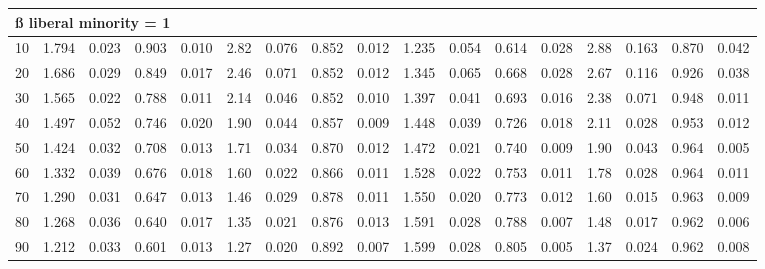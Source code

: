 \documentclass[
]{article}
\begin{document}
\begin{table}[H]
\begin{table}
{\begin{tabular}{r|r|r|r|r|r|r|r|r|r|r|r|r|r|r|r|r}
\hline
\multicolumn{17}{l}{\textbf{ß liberal minority = 1}}\\
\hline
\hspace{1em}10 & 1.794 & 0.023 & 0.903 & 0.010 & 2.82 & 0.076 & 0.852 & 0.012 & 1.235 & 0.054 & 0.614 & 0.028 & 2.88 & 0.163 & 0.870 & 0.042\\
\hline
\hspace{1em}20 & 1.686 & 0.029 & 0.849 & 0.017 & 2.46 & 0.071 & 0.852 & 0.012 & 1.345 & 0.065 & 0.668 & 0.028 & 2.67 & 0.116 & 0.926 & 0.038\\
\hline
\hspace{1em}30 & 1.565 & 0.022 & 0.788 & 0.011 & 2.14 & 0.046 & 0.852 & 0.010 & 1.397 & 0.041 & 0.693 & 0.016 & 2.38 & 0.071 & 0.948 & 0.011\\
\hline
\hspace{1em}40 & 1.497 & 0.052 & 0.746 & 0.020 & 1.90 & 0.044 & 0.857 & 0.009 & 1.448 & 0.039 & 0.726 & 0.018 & 2.11 & 0.028 & 0.953 & 0.012\\
\hline
\hspace{1em}50 & 1.424 & 0.032 & 0.708 & 0.013 & 1.71 & 0.034 & 0.870 & 0.012 & 1.472 & 0.021 & 0.740 & 0.009 & 1.90 & 0.043 & 0.964 & 0.005\\
\hline
\hspace{1em}60 & 1.332 & 0.039 & 0.676 & 0.018 & 1.60 & 0.022 & 0.866 & 0.011 & 1.528 & 0.022 & 0.753 & 0.011 & 1.78 & 0.028 & 0.964 & 0.011\\
\hline
\hspace{1em}70 & 1.290 & 0.031 & 0.647 & 0.013 & 1.46 & 0.029 & 0.878 & 0.011 & 1.550 & 0.020 & 0.773 & 0.012 & 1.60 & 0.015 & 0.963 & 0.009\\
\hline
\hspace{1em}80 & 1.268 & 0.036 & 0.640 & 0.017 & 1.35 & 0.021 & 0.876 & 0.013 & 1.591 & 0.028 & 0.788 & 0.007 & 1.48 & 0.017 & 0.962 & 0.006\\
\hline
\hspace{1em}90 & 1.212 & 0.033 & 0.601 & 0.013 & 1.27 & 0.020 & 0.892 & 0.007 & 1.599 & 0.028 & 0.805 & 0.005 & 1.37 & 0.024 & 0.962 & 0.008\\
\hline
\end{tabular}}
\end{table}
\end{table}
\end{document}
